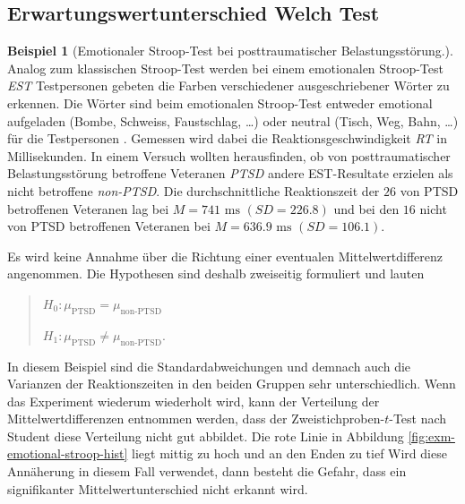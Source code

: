 \documentclass[
]{book}
\theoremstyle{definition}
\theoremstyle{definition}
\newtheorem{example}{Beispiel}[chapter]
\theoremstyle{definition}
\theoremstyle{definition}
\theoremstyle{remark}
\begin{document}
\subsection{Erwartungswertunterschied Welch Test}\label{erwartungswertunterschied-welch-test}

\begin{example}[Emotionaler Stroop-Test bei posttraumatischer Belastungsstörung.]
\protect\hypertarget{exm:emotional-stroop}{}\label{exm:emotional-stroop}Analog zum klassischen Stroop-Test werden bei einem emotionalen Stroop-Test \emph{EST} Testpersonen gebeten die Farben verschiedener ausgeschriebener Wörter zu erkennen. Die Wörter sind beim emotionalen Stroop-Test entweder emotional aufgeladen (Bombe, Schweiss, Faustschlag, \ldots) oder neutral (Tisch, Weg, Bahn, \ldots) für die Testpersonen \citep{williams1996}. Gemessen wird dabei die Reaktionsgeschwindigkeit \emph{RT} in Millisekunden. In einem Versuch wollten \citet{khanna2017} herausfinden, ob von posttraumatischer Belastungsstörung betroffene Veteranen \emph{PTSD} andere EST-Resultate erzielen als nicht betroffene \emph{non-PTSD}. Die durchschnittliche Reaktionszeit der \(26\) von PTSD betroffenen Veteranen lag bei \(M=741\text{ ms }(SD = 226.8)\) und bei den \(16\) nicht von PTSD betroffenen Veteranen bei \(M=636.9 \text{ ms }(SD = 106.1)\).
\end{example}

Es wird keine Annahme über die Richtung einer eventualen Mittelwertdifferenz angenommen. Die Hypothesen sind deshalb zweiseitig formuliert und lauten

\begin{quote}
\(H_0: \mu_\text{PTSD} = \mu_\text{non-PTSD}\)

\(H_1: \mu_\text{PTSD} \neq \mu_\text{non-PTSD}.\)
\end{quote}

In diesem Beispiel sind die Standardabweichungen und demnach auch die Varianzen der Reaktionszeiten in den beiden Gruppen sehr unterschiedlich. Wenn das Experiment wiederum wiederholt wird, kann der Verteilung der Mittelwertdifferenzen entnommen werden, dass der Zweistichproben-\(t\)-Test nach Student diese Verteilung nicht gut abbildet. Die rote Linie in Abbildung \ref{fig:exm-emotional-stroop-hist} liegt mittig zu hoch und an den Enden zu tief Wird diese Annäherung in diesem Fall verwendet, dann besteht die Gefahr, dass ein signifikanter Mittelwertunterschied nicht erkannt wird.
\end{document}
